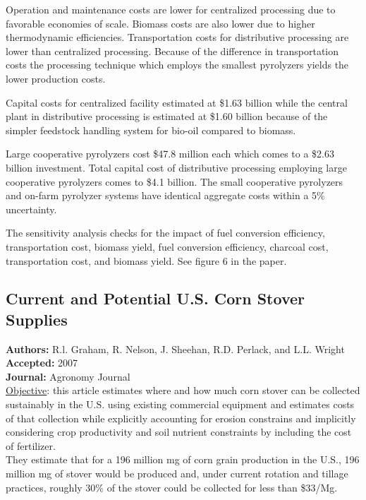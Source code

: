 \documentclass{article}\usepackage[]{graphicx}\usepackage[]{color}
\begin{document}
Operation and maintenance costs are lower for centralized processing due to favorable economies of scale.  Biomass costs are also lower due to higher thermodynamic efficiencies.  Transportation costs for distributive processing are lower than centralized processing.  Because of the difference in transportation costs the processing technique which employs the smallest pyrolyzers yields the lower production costs.  

Capital costs for centralized facility estimated at \$1.63 billion while the central plant in distributive processing is estimated at \$1.60 billion because of the simpler feedstock handling system for bio-oil compared to biomass.

Large cooperative pyrolyzers cost \$47.8 million each which comes to a \$2.63 billion investment.  Total capital cost of distributive processing employing large cooperative pyrolyzers comes to \$4.1 billion.  The small cooperative pyrolyzers and on-farm pyrolyzer systems have identical aggregate costs within a 5\% uncertainty.

The sensitivity analysis checks for the impact of fuel conversion efficiency, transportation cost, biomass yield, fuel conversion efficiency, charcoal cost, transportation cost, and biomass yield.  See figure 6 in the paper.  




\subsection{Current and Potential U.S. Corn Stover Supplies}
\textbf{Authors:} R.l. Graham, R. Nelson, J. Sheehan, R.D. Perlack, and L.L. Wright \\
\textbf{Accepted:} 2007 \\
\textbf{Journal:} Agronomy Journal \\

\underline{Objective}: this article estimates where and how much corn stover can be collected sustainably in the U.S. using existing commercial equipment and estimates costs of that collection while explicitly accounting for erosion constrains and implicitly considering crop productivity and soil nutrient constraints by including the cost of fertilizer. \\

They estimate that for a 196 million mg of corn grain production in the U.S., 196 million mg of stover would be produced and, under current rotation and tillage practices, roughly 30\% of the stover could be collected for less than \$33/Mg. \\
\end{document}

